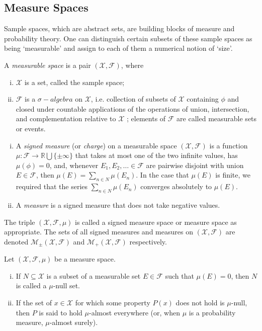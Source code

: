 \subsection{Measure Spaces}
Sample spaces, which are abstract sets, are building blocks of measure and probability theory. One can distinguish certain subsets of these sample spaces as being `measurable' and assign to each of them a numerical notion of `size'. 
\begin{defn}
	A \textit{measurable space} is a pair $(\mathscr{X}, \mathscr{F})$, where
	\begin{enumerate}[i.]
		\item $\mathscr{X}$ is a set, called the sample space;
		\item $\mathscr{F}$ is a $\sigma-algebra$ on $\mathscr{X}$, i.e. collection of subsets of $\mathscr{X}$ containing $\phi$ and closed under
countable applications of the operations of union, intersection, and complementation relative to $\mathscr{X}$ ; elements of $\mathscr{F}$ are called measurable sets or events.
	\end{enumerate}
\end{defn}
\begin{defn}
	\begin{enumerate}[i.]
		\item A \textit{signed measure} (or \textit{charge}) on a measurable space $(\mathscr{X}, \mathscr{F})$ is a
function $\mu : \mathscr{F} \to \mathbb{R} \bigcup \{\pm\infty\}$ that takes at most one of the two infinite values, has $\mu(\phi) = 0$, and,
whenever $E_1, E_2, \dots \in \mathscr{F}$ are pairwise disjoint with union $E \in \mathscr{F}$,
then
$\mu(E) =
\sum_{n \in N} \mu(E_n)$. In the case that $\mu(E)$ is finite, we required that the series $\sum_{n \in N} \mu(E_n)$ converges absolutely to $\mu(E)$.
		\item  A \textit{measure} is a signed measure that does not take negative values.
	\end{enumerate}
\end{defn}
\begin{remark}
	The triple $(\mathscr{X}, \mathscr{F}, \mu)$ is called a signed measure space or measure space as appropriate. The sets of all signed measures and measures on $(\mathscr{X}, \mathscr{F})$ are denoted $\mathscr{M}_{\pm}(\mathscr{X}, \mathscr{F})$ and $\mathscr{M}_{+}(\mathscr{X}, \mathscr{F})$ respectively.
\end{remark}
\begin{defn}
	Let $(\mathscr{X}, \mathscr{F}, \mu)$ be a measure space.
	\begin{enumerate}[i.]
		\item If $N \subseteq \mathscr{X}$ is a subset of a measurable set $E \in \mathscr{F}$ such that $\mu(E) = 0$, then $N$ is called
a $\mu$-null set.
		\item If the set of $x \in \mathscr{X}$ for which some property $P(x)$ does not hold is $\mu$-null, then $P$ is said
to hold $\mu$-almost everywhere (or, when $\mu$ is a probability measure, $\mu$-almost surely).
	\end{enumerate}
\end{defn}
